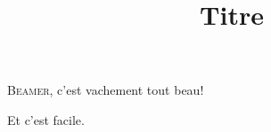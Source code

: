 \documentclass{beamer}
\title{Titre}
\author{}\institute{}
\begin{document}
	
	
	
	\begin{frame}
		\titlepage
	\end{frame}

\begin{frame}
	\textsc{Beamer}, c'est vachement tout beau!
\end{frame}

\begin{frame}
Et c'est facile.
\end{frame}
\end{document}
